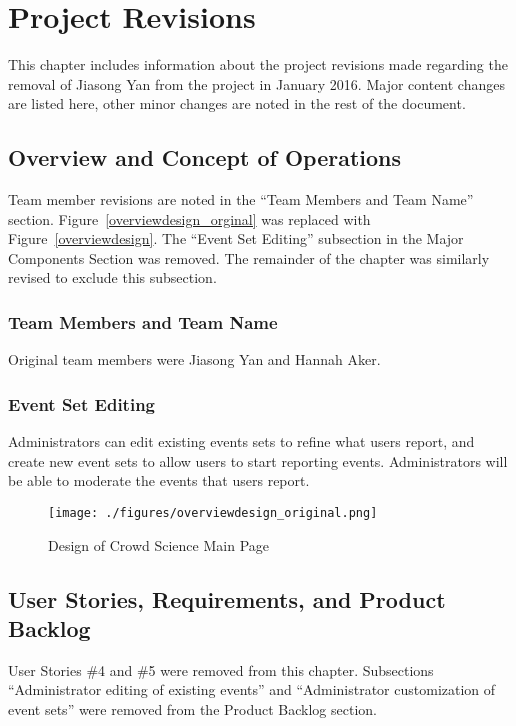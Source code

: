 

\chapter{Project Revisions}\label{chap:revisions}
This chapter includes information about the project revisions made regarding the removal of Jiasong Yan from the project in January 2016. Major content changes are listed here, other minor changes are noted in the rest of the document.

\section{Overview and Concept of Operations}
Team member revisions are noted in the ``Team Members and Team Name'' section.  Figure~\ref{overviewdesign_orginal} was replaced with Figure~\ref{overviewdesign}. The ``Event Set Editing'' subsection in the Major Components Section was removed. The remainder of the chapter was similarly revised to exclude this subsection.

\subsection{Team Members and Team Name}
Original team members were Jiasong Yan and Hannah Aker.

\subsection{Event Set Editing}
Administrators can edit existing events sets to refine what users report, and create new event sets to allow users to start reporting events.  Administrators will be able to moderate the events that users report.

\begin{figure}[tbh]
\begin{center}
\texttt{[image: ./figures/overviewdesign\_original.png]}
\end{center}
\caption{Design of Crowd Science Main Page\label{overviewdesign_original}}
\end{figure}

\section{User Stories, Requirements, and Product Backlog}
User Stories \#4 and \#5 were removed from this chapter. Subsections ``Administrator editing of existing events'' and ``Administrator customization of event sets'' were removed from the Product Backlog section.


